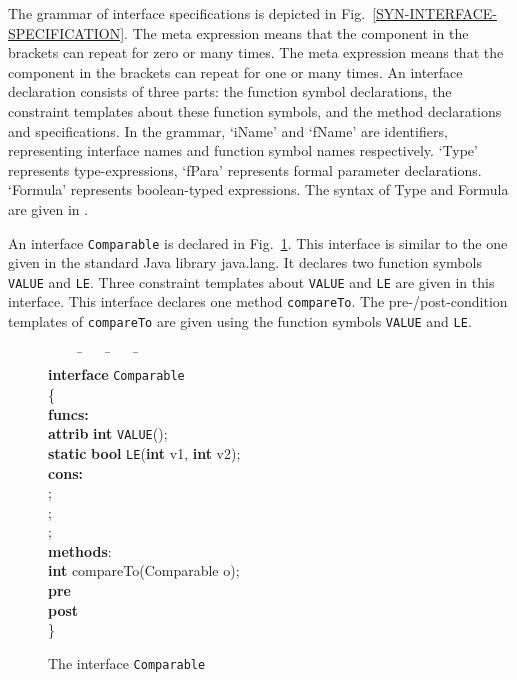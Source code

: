 \documentclass[fleqn]{llncs}
\begin{document}
The grammar of interface specifications is depicted in Fig.~\ref{SYN-INTERFACE-SPECIFICATION}.
The meta expression   means that the component in the brackets can repeat for zero or many times.
The meta expression   means that the component in the brackets can repeat for one or many times. An interface declaration
consists of three parts: the function symbol declarations, the constraint templates about these function symbols, and the method declarations and specifications.
In the grammar, `iName' and `fName' are identifiers, representing interface names and function symbol names respectively.
`Type' represents type-expressions, `fPara' represents formal parameter declarations. `Formula' represents boolean-typed expressions.
The syntax of Type and Formula are given in \cite{DBLP:conf/ictac/ZhaoL13}.

\begin{example}
An interface \texttt{Comparable} is declared in Fig.~\ref{FIG-COMPARABLE}.
This interface is similar to the one given in the standard Java library java.lang.
It declares two function symbols \texttt{VALUE} and \texttt{LE}. Three constraint templates about \texttt{VALUE} and \texttt{LE} are given in this interface.
This interface declares one method \texttt{compareTo}. The pre-/post-condition templates of \texttt{compareTo} are given
using the function symbols \texttt{VALUE} and \texttt{LE}.


\hfill
\end{example}


\begin{figure}
\begin{center}
\begin{boxedminipage}{1\textwidth}
\scriptsize
\begin{tabbing}
\ \ \ \ \=\ \ \ \ \=\ \ \ \ \=\ \ \ \=\\
\textbf{interface} \texttt{Comparable}\\
\{\\
\textbf{funcs:}\\
    \>\textbf{attrib} \textbf{int}  \texttt{VALUE}();\\
    \>\textbf{static} \textbf{bool} \texttt{LE}(\textbf{int} v1, \textbf{int} v2);\\
\textbf{cons:}\\
\>;\\
    \>;\\
    \>;\\
\textbf{methods}:\\
    \>\textbf{int} compareTo(Comparable o);\\
    \>  \>\textbf{pre}\ \ \>\>\\
    \>  \>\textbf{post}\  \>\>\\
\}\\
\end{tabbing}
\end{boxedminipage}
\end{center}
\caption{The interface \texttt{Comparable}}\label{FIG-COMPARABLE}
\end{figure}
\end{document}
